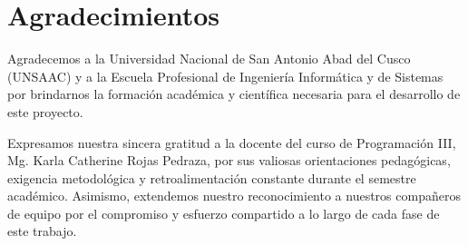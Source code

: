 \chapter*{Agradecimientos}

Agradecemos a la Universidad Nacional de San Antonio Abad del Cusco (UNSAAC) y a la Escuela Profesional de Ingeniería Informática y de Sistemas por brindarnos la formación académica y científica necesaria para el desarrollo de este proyecto.

Expresamos nuestra sincera gratitud a la docente del curso de Programación III, Mg. Karla Catherine Rojas Pedraza, por sus valiosas orientaciones pedagógicas, exigencia metodológica y retroalimentación constante durante el semestre académico. Asimismo, extendemos nuestro reconocimiento a nuestros compañeros de equipo por el compromiso y esfuerzo compartido a lo largo de cada fase de este trabajo.
